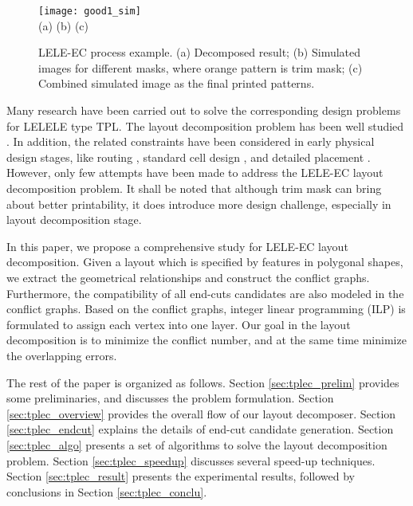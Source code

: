 \documentclass[12pt]{spieman}
\theoremstyle{plain}
\begin{document}
\begin{spacing}{1}
\begin{figure}[tb]
  \centering
  \texttt{[image: good1\_sim]}
  \\ (a) \hspace{3.8cm} (b) \hspace{3.8cm} (c)
  \caption{LELE-EC process example.
  (a) Decomposed result;
  (b) Simulated images for different masks, where orange pattern is trim mask;
  (c) Combined simulated image as the final printed patterns.
  }
  \label{fig:tplec_ec_img}
\end{figure}



Many research have been carried out to solve the corresponding design problems for LELELE type TPL.
The layout decomposition problem has been well studied
\cite{TPL_SPIE08_Cork,TPL_ICCAD2011_Yu,TPL_DAC2012_Fang,TPL_ICCAD2012_Tian,TPL_DAC2013_Kuang,TPL_ICCAD2013_Yu,TPL_ICCAD2013_Zhang,MPL_DAC2014_Yu}.
In addition, the related constraints have been considered in early physical design stages, like routing \cite{DFM_DAC2012_Ma,DFM_ICCAD2012_Lin},
standard cell design \cite{TPL_ICCAD2013_Tian,DFM_ICCAD2013_Yu}, and detailed placement \cite{DFM_ICCAD2013_Yu}.
However, only few attempts have been made to address the LELE-EC layout decomposition problem.
It shall be noted that although trim mask can bring about better printability, it does introduce more design challenge, especially in layout decomposition stage.


In this paper, we propose a comprehensive study for LELE-EC layout decomposition.
Given a layout which is specified by features in polygonal shapes, we extract the geometrical relationships and construct the conflict graphs.
Furthermore, the compatibility of all end-cuts candidates are also modeled in the conflict graphs.
Based on the conflict graphs, integer linear programming (ILP) is formulated to assign each vertex into one layer.
Our goal in the layout decomposition is to minimize the conflict number, and at the same time minimize the overlapping errors.


The rest of the paper is organized as follows.
Section \ref{sec:tplec_prelim} provides some preliminaries, and discusses the problem formulation.
Section \ref{sec:tplec_overview} provides the overall flow of our layout decomposer.
Section \ref{sec:tplec_endcut} explains the details of end-cut candidate generation.
Section \ref{sec:tplec_algo} presents a set of algorithms to solve the layout decomposition problem.
Section \ref{sec:tplec_speedup} discusses several speed-up techniques.
Section \ref{sec:tplec_result} presents the experimental results, followed by conclusions in Section \ref{sec:tplec_conclu}.



\end{spacing}
\end{document}
